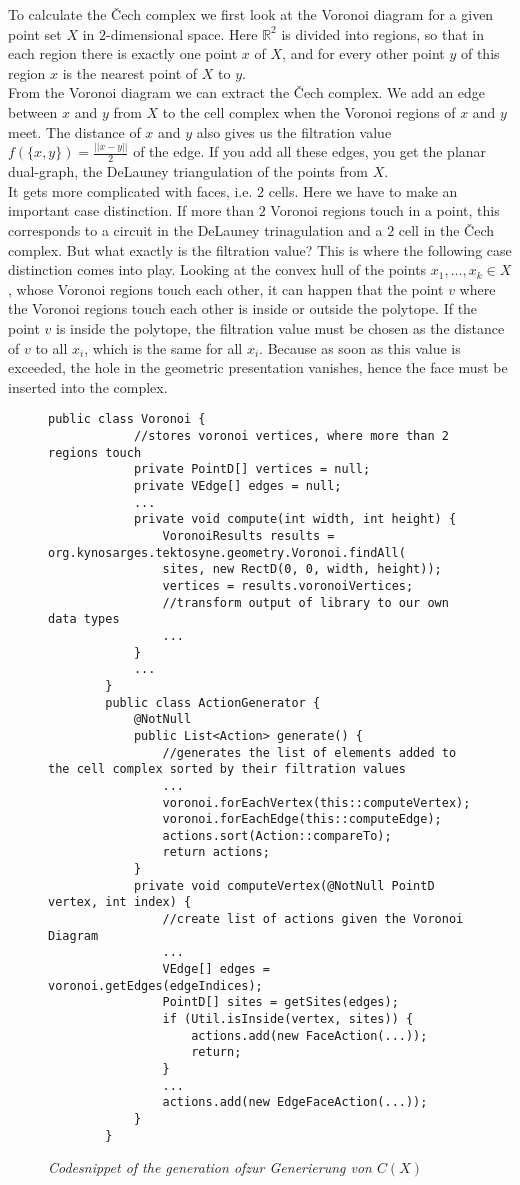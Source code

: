 \documentclass[11pt, a4paper,draft]{report}
\newcommand{\bR}{\mathbb{R}}
\begin{document}
	To calculate the Čech complex we first look at the Voronoi diagram for a given point set $X$ in $2$-dimensional space. Here $\bR^2$ is divided into regions, so that in each region there is exactly one point $x$ of $X$, and for every other point $y$ of this region $x$ is the nearest point of $X$ to $y$.\\
From the Voronoi diagram we can extract the Čech complex. We add an edge between $x$ and $y$ from $X$ to the cell complex when the Voronoi regions of $x$ and $y$ meet. The distance of $x$ and $y$ also gives us the filtration value $f(\{x,y\}) = \frac{||x-y||}{2}$ of the edge. If you add all these edges, you get the planar dual-graph, the DeLauney triangulation of the points from $X$.\\
It gets more complicated with faces, i.e. $2$ cells. Here we have to make an important case distinction. If more than $2$ Voronoi regions touch in a point, this corresponds to a circuit in the DeLauney trinagulation and a $2$ cell in the Čech complex. But what exactly is the filtration value? This is where the following case distinction comes into play. Looking at the convex hull of the points $x_1,\ldots,x_k\in X$, whose Voronoi regions touch each other, it can happen that the point $v$ where the Voronoi regions touch each other is inside or outside the polytope. If the point $v$ is inside the polytope, the filtration value must be chosen as the distance of $v$ to all $x_i$, which is the same for all $x_i$. Because as soon as this value is exceeded, the hole in the geometric presentation vanishes, hence the face must be inserted into the complex.\\
 	\lstset{language=Java}
 	\begin{figure}
 		\begin{lstlisting}[frame=single]
 		public class Voronoi {
	 		//stores voronoi vertices, where more than 2 regions touch
	 		private PointD[] vertices = null;
	 		private VEdge[] edges = null;
	 		...
	 		private void compute(int width, int height) {
		 		VoronoiResults results = org.kynosarges.tektosyne.geometry.Voronoi.findAll(
		 		sites, new RectD(0, 0, width, height));
		 		vertices = results.voronoiVertices;
		 		//transform output of library to our own data types
		 		...
	 		}
	 		...
 		}
 		public class ActionGenerator {
	 		@NotNull
	 		public List<Action> generate() {
		 		//generates the list of elements added to the cell complex sorted by their filtration values
		 		...
		 		voronoi.forEachVertex(this::computeVertex);
		 		voronoi.forEachEdge(this::computeEdge);
		 		actions.sort(Action::compareTo);
		 		return actions;
		 	}
		 	private void computeVertex(@NotNull PointD vertex, int index) {
		 		//create list of actions given the Voronoi Diagram
		 		...
		 		VEdge[] edges = voronoi.getEdges(edgeIndices);
		 		PointD[] sites = getSites(edges);
		 		if (Util.isInside(vertex, sites)) {
		 			actions.add(new FaceAction(...));
		 			return;
		 		}
		 		...
		 		actions.add(new EdgeFaceAction(...));
	 		}
 		}
 		\end{lstlisting}
 		\caption{\textit{Codesnippet of the generation ofzur Generierung von $C(X)$}}
 		\label{fig3}
 	\end{figure}
\end{document}
